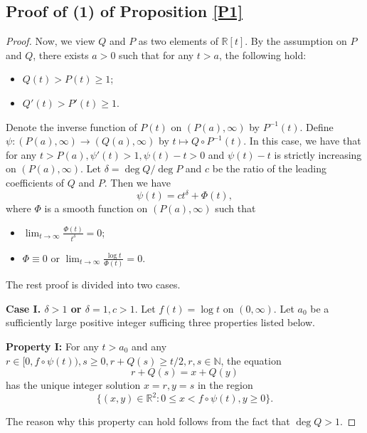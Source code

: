 \documentclass[reqno,12pt]{amsart}
\def \N {\mathbb N}
\def \R {\mathbb R}
\numberwithin{equation}{section}
\begin{document}
\subsection{Proof of (1) of Proposition \ref{P1}}
\begin{proof}
		Now, we view $Q$ and $P$ as two elements of $\R[t]$. By the assumption on $P$ and $Q$, there exists $a>0$ such that for any $t>a$, the following hold:
	\begin{itemize}
		\item $Q(t)>P(t)\ge 1$;
		\item $Q'(t)>P'(t)\ge 1$.
	\end{itemize}
	Denote the inverse function of $P(t)$ on $(P(a),\infty)$ by $P^{-1}(t)$. Define $\psi:(P(a),\infty)\to (Q(a),\infty)$ by $t\mapsto Q\circ P^{-1}(t)$. In this case, we have that for any $t>P(a),\psi'(t)>1,\psi(t)-t>0$ and $\psi(t)-t$ is strictly increasing on $(P(a),\infty)$. Let $\delta=\deg Q/\deg P$ and $c$ be the ratio of the leading coefficients of $Q$ and $P$. Then we have
	\begin{equation}\label{eq100}
		\psi(t)= ct^{\delta}+\Phi(t),
	\end{equation}
	where $\Phi$ is a smooth function on $(P(a),\infty)$ such that
\begin{itemize}
\item ${\displaystyle\lim_{t\rightarrow \infty}\frac{\Phi(t)}{t^{\delta}}}=0$;
\item $\Phi\equiv0$ or ${\displaystyle\lim_{t\to \infty}\frac{\log t}{\Phi(t)}=0.}$
\end{itemize}
	
	The rest proof is divided into two cases.
	
	\noindent \textbf{Case I. $\delta>1$ or $\delta=1,c>1$}.
		Let $f(t)=\log t$ on $(0,\infty)$. Let $a_0$ be a sufficiently large positive integer  sufficing three properties listed below.

\noindent \textbf{Property I:}
 For any $t>a_0$ and any $r\in [0,f\circ\psi(t)),s\ge 0,r+Q(s)\ge t/2,r,s\in\N$, the equation
 $$r+Q(s)=x+Q(y)$$
  has the unique integer solution $x=r,y=s$ in the region
 $$\{(x,y)\in \R^2:0\le x<f\circ \psi(t),y\ge 0\}.$$

 The reason why this property can hold follows from the fact that $\deg Q>1$.


\end{proof}
\end{document}
